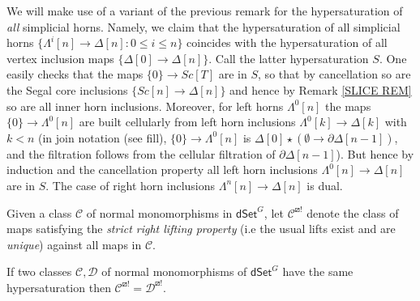 \documentclass[a4paper,10pt,draft]{article}%
\begin{document}
\begin{remark}\label{HYPERSATKAN REM}
	We will make use of a variant of the previous remark for the hypersaturation of \textit{all} simplicial horns.
	Namely, we claim that the hypersaturation of all simplicial horns 
	$\{\Lambda^i[n] \to \Delta[n] \colon 0 \leq i \leq n\}$
	coincides with the hypersaturation of all vertex inclusion maps
	$\{\Delta[0] \to \Delta[n]\}$.
	Call the latter hypersaturation $S$. 
	One easily checks that the maps $\{0\} \to Sc[T]$ are in $S$, so that by cancellation so are the Segal core inclusions 
	$\{Sc[n] \to \Delta[n]\}$ and hence by Remark \ref{SLICE REM} so are all inner horn inclusions. 
	Moreover, for left horns $\Lambda^0[n]$
	the maps $\{0\} \to \Lambda^0[n]$ are built cellularly
	from left horn inclusions
	$\Lambda^0[k] \to \Delta[k]$ with $k<n$
	(in join notation (see {\color{blue} fill}),
	$\{0\} \to \Lambda^0[n]$ is 
	$\Delta[0] \star (\emptyset \to \partial \Delta[n-1])$, and the filtration follows from the cellular filtration of $\partial \Delta[n-1]$).
	But hence by induction and the cancellation property all left horn inclusions 
	$\Lambda^0[n] \to \Delta[n]$
are in $S$. The case of right horn inclusions $\Lambda^n[n] \to \Delta[n]$ is dual.
\end{remark}

Given a class $\mathcal{C}$ of normal monomorphisms in $\mathsf{dSet}^G$, let $\mathcal{C}^{\boxslash !}$
denote the class of maps satisfying the 
\textit{strict right lifting property} (i.e the usual lifts exist and are \textit{unique})
against all maps in $\mathcal{C}$.

\begin{proposition}\label{HYPER_LP_PROP}
	If two classes $\mathcal{C},\mathcal{D}$
	of normal monomorphisms of $\mathsf{dSet}^G$
	have the same hypersaturation then
	$\mathcal{C}^{\boxslash !} = \mathcal{D}^{\boxslash !}$.
\end{proposition}
\end{document}
